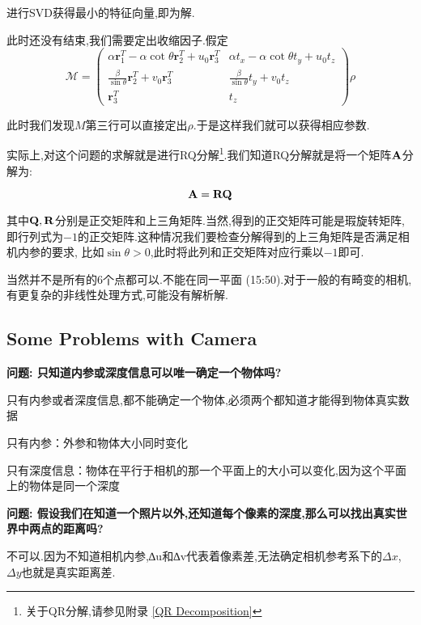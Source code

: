 进行SVD获得最小的特征向量,即为解.

此时还没有结束,我们需要定出收缩因子.假定
\begin{equation}
	\mathcal{M}=\left(\begin{array}{cc}
		\alpha \boldsymbol{r}_{1}^{T}-\alpha \cot \theta \boldsymbol{r}_{2}^{T}+u_{0} \boldsymbol{r}_{3}^{T} & \alpha t_{x}-\alpha \cot \theta t_{y}+u_{0} t_{z} \\
		\frac{\beta}{\sin \theta} \boldsymbol{r}_{2}^{T}+v_{0} \boldsymbol{r}_{3}^{T} & \frac{\beta}{\sin \theta} t_{y}+v_{0} t_{z} \\
		\boldsymbol{r}_{3}^{T} & t_{z}
	\end{array}\right) \rho
\end{equation}

此时我们发现$M$第三行可以直接定出$\rho$.于是这样我们就可以获得相应参数.

实际上,对这个问题的求解就是进行RQ分解\footnote{关于QR分解,请参见附录 \ref{QR Decomposition}}.我们知道RQ分解就是将一个矩阵$\bold{A}$分解为:

\begin{equation}
	\bold{A} =  \bold{R} \bold{Q}
\end{equation}

其中$\bold{Q}, \bold{R}$分别是正交矩阵和上三角矩阵.当然,得到的正交矩阵可能是瑕旋转矩阵,
即行列式为$-1$的正交矩阵.这种情况我们要检查分解得到的上三角矩阵是否满足相机内参的要求,
比如$\sin \theta > 0$,此时将此列和正交矩阵对应行乘以$-1$即可.

当然并不是所有的6个点都可以.不能在同一平面 (15:50).对于一般的有畸变的相机,有更复杂的非线性处理方式,可能没有解析解.

\subsection{Some Problems with Camera}

\textbf{问题: 只知道内参或深度信息可以唯一确定一个物体吗?}

只有内参或者深度信息,都不能确定一个物体,必须两个都知道才能得到物体真实数据

只有内参：外参和物体大小同时变化

只有深度信息：物体在平行于相机的那一个平面上的大小可以变化,因为这个平面上的物体是同一个深度

\textbf{问题: 假设我们在知道一个照片以外,还知道每个像素的深度,那么可以找出真实世界中两点的距离吗?}

不可以.因为不知道相机内参,∆u和∆v代表着像素差,无法确定相机参考系下的$\Delta x$,$\Delta y$也就是真实距离差.

